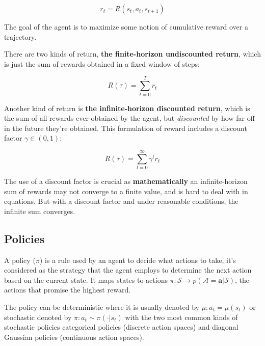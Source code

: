 \begin{center}
		\begin{equation}
				r_{t}=R\left(s_{t}, a_{t}, s_{t+1}\right)
		\end{equation}
\end{center}

The goal of the agent is to maximize some notion of cumulative reward over a trajectory.

There are two kinds of return, \textbf{the finite-horizon undiscounted return}, which is just the sum of rewards obtained in a fixed window of steps:

\begin{center}
		\begin{equation} \label{eq:1}
				R(\tau)=\sum_{t=0}^{T} r_{t}
		\end{equation}
\end{center}

Another kind of return is \textbf{the infinite-horizon discounted return}, which is the sum of all rewards ever obtained by the agent, but \textit{discounted} by how far off in the future they’re obtained. This formulation of reward includes a discount factor \(\gamma \in(0,1)\):

\begin{center}
		\begin{equation} \label{eq:2}
				R(\tau)=\sum_{t=0}^{\infty} \gamma^{t} r_{t}
		\end{equation}
\end{center}

The use of a discount factor is crucial as \textbf{mathematically} an infinite-horizon sum of rewards may not converge to a finite value, and is hard to deal with in equations. But with a discount factor and under reasonable conditions, the infinite sum converges.

\subsection{Policies}
A policy ($\pi$) is a rule used by an agent to decide what actions to take, it's considered as the strategy that the agent employs to determine the next action based on the current state. It maps states to actions $ \pi : \mathcal{S} \rightarrow p(\mathcal{A}=\mathbf{a} | \mathcal{S}) $, the actions that promise the highest reward.

The policy can be deterministic where it is usually denoted by $ \mu: a_{t}=\mu\left(s_{t}\right) $
or stochastic denoted by $ \pi:  a_{t} \sim \pi\left(\cdot | s_{t}\right) $
with the two most common kinds of stochastic policies categorical policies (discrete action spaces) and diagonal Gaussian policies (continuous action spaces).

